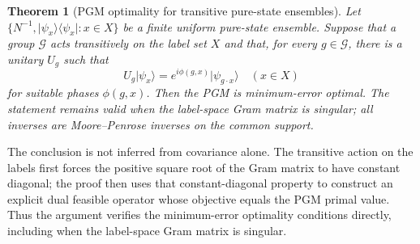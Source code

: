 \documentclass[11pt]{article}
\newcommand{\1}{\mathbf 1}
\newcommand{\ket}[1]{\lvert #1\rangle}
\newcommand{\bra}[1]{\langle #1\rvert}
\theoremstyle{plain}
\newtheorem{theorem}{Theorem}[section]
\theoremstyle{definition}
\theoremstyle{remark}
\begin{document}
\begin{theorem}[PGM optimality for transitive pure-state ensembles]
\label{thm:transitive-pure-pgm}
Let $\{N^{-1},\ket{\psi_x}\!\bra{\psi_x}:x\in X\}$ be a finite
uniform pure-state ensemble.  Suppose that a group $\mathcal G$ acts
transitively on the label set $X$ and that, for every $g\in\mathcal G$, there
is a unitary $U_g$ such that
\begin{equation}
 U_g\ket{\psi_x}=e^{i\phi(g,x)}\ket{\psi_{g\cdot x}}
 \quad(x\in X)
 \label{eq:transitive-labeled-ensemble-covariance}
\end{equation}
for suitable phases $\phi(g,x)$.  Then the PGM is minimum-error optimal.  The
statement remains valid when the label-space Gram matrix is singular; all
inverses are Moore--Penrose inverses on the common support.
\end{theorem}
The conclusion is not inferred from covariance alone.  The transitive action
on the labels first forces the positive square root of the Gram matrix to have
constant diagonal;
the proof then uses that constant-diagonal property to construct an explicit
dual feasible operator whose objective equals the PGM primal value.  Thus the
argument verifies the minimum-error optimality conditions directly, including
when the label-space Gram matrix is singular.
\end{document}
